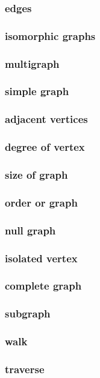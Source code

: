 \documentclass[a4paper]{article}
\begin{document}
\subsubsection*{edges}
\subsubsection*{isomorphic graphs}
\subsubsection*{multigraph}
\subsubsection*{simple graph}
\subsubsection*{adjacent vertices}
\subsubsection*{degree of vertex}
\subsubsection*{size of graph}
\subsubsection*{order or graph}
\subsubsection*{null graph}
\subsubsection*{isolated vertex}
\subsubsection*{complete graph}
\subsubsection*{subgraph}
\subsubsection*{walk}
\subsubsection*{traverse}
\end{document}
